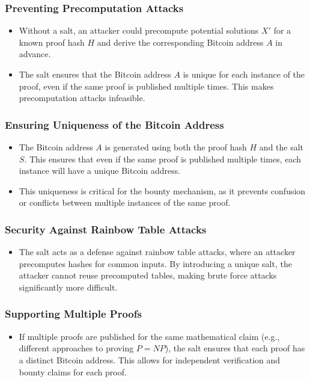 \documentclass[12pt]{report}
\begin{document}
\subsubsection{Preventing Precomputation Attacks}
\begin{itemize}
    \item Without a salt, an attacker could precompute potential solutions \( X' \) for a known proof hash \( H \) and derive the corresponding Bitcoin address \( A \) in advance.
    \item The salt ensures that the Bitcoin address \( A \) is unique for each instance of the proof, even if the same proof is published multiple times. This makes precomputation attacks infeasible.
\end{itemize}

\subsubsection{Ensuring Uniqueness of the Bitcoin Address}
\begin{itemize}
    \item The Bitcoin address \( A \) is generated using both the proof hash \( H \) and the salt \( S \). This ensures that even if the same proof is published multiple times, each instance will have a unique Bitcoin address.
    \item This uniqueness is critical for the bounty mechanism, as it prevents confusion or conflicts between multiple instances of the same proof.
\end{itemize}

\subsubsection{Security Against Rainbow Table Attacks}
\begin{itemize}
    \item The salt acts as a defense against rainbow table attacks, where an attacker precomputes hashes for common inputs. By introducing a unique salt, the attacker cannot reuse precomputed tables, making brute force attacks significantly more difficult.
\end{itemize}

\subsubsection{Supporting Multiple Proofs}
\begin{itemize}
    \item If multiple proofs are published for the same mathematical claim (e.g., different approaches to proving \( P = NP \)), the salt ensures that each proof has a distinct Bitcoin address. This allows for independent verification and bounty claims for each proof.
\end{itemize}
\end{document}
